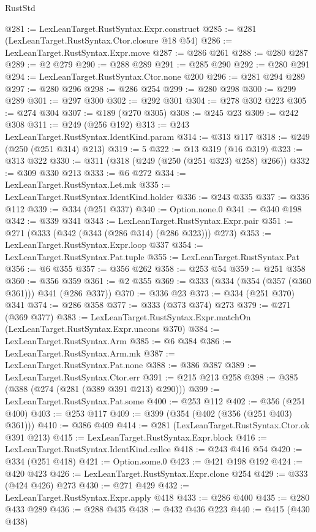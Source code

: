 \begin{lexlean}{RustStd}
\begin{coremodule}
@281 := LexLeanTarget.RustSyntax.Expr.construct
@285 := @281 (LexLeanTarget.RustSyntax.Ctor.closure @18 @54)
@286 := LexLeanTarget.RustSyntax.Expr.move
@287 := @286 @261
@288 := @280 @287
@289 := @2 @279
@290 := @288 @289
@291 := @285 @290
@292 := @280 @291
@294 := LexLeanTarget.RustSyntax.Ctor.none @200
@296 := @281 @294 @289
@297 := @280 @296
@298 := @286 @254
@299 := @280 @298
@300 := @299 @289
@301 := @297 @300
@302 := @292 @301
@304 := @278 @302 @223
@305 := @274 @304
@307 := @189 (@270 @305)
@308 := @245 @23
@309 := @242 @308
@311 := @249 (@256 @192)
@313 := @243 LexLeanTarget.RustSyntax.IdentKind.param
@314 := @313 @117
@318 := @249 (@250 (@251 @314) @213)
@319 := 5
@322 := @13 @319 (@16 @319)
@323 := @313 @322
@330 := @311 (@318 (@249 (@250 (@251 @323) @258) @266))
@332 := @309 @330 @213
@333 := @6 @272
@334 := LexLeanTarget.RustSyntax.Let.mk
@335 := LexLeanTarget.RustSyntax.IdentKind.holder
@336 := @243 @335
@337 := @336 @112
@339 := @334 (@251 @337)
@340 := Option.none.{0}
@341 := @340 @198
@342 := @339 @341
@343 := LexLeanTarget.RustSyntax.Expr.pair
@351 := @271 (@333 (@342 (@343 (@286 @314) (@286 @323))) @273)
@353 := LexLeanTarget.RustSyntax.Expr.loop @337
@354 := LexLeanTarget.RustSyntax.Pat.tuple
@355 := LexLeanTarget.RustSyntax.Pat
@356 := @6 @355
@357 := @356 @262
@358 := @253 @54
@359 := @251 @358
@360 := @356 @359
@361 := @2 @355
@369 := @333 (@334 (@354 (@357 (@360 @361))) @341 (@286 @337))
@370 := @336 @23
@373 := @334 (@251 @370) @341
@374 := @286 @358
@377 := @333 (@373 @374) @273
@379 := @271 (@369 @377)
@383 := LexLeanTarget.RustSyntax.Expr.matchOn (LexLeanTarget.RustSyntax.Expr.uncons @370)
@384 := LexLeanTarget.RustSyntax.Arm
@385 := @6 @384
@386 := LexLeanTarget.RustSyntax.Arm.mk
@387 := LexLeanTarget.RustSyntax.Pat.none
@388 := @386 @387
@389 := LexLeanTarget.RustSyntax.Ctor.err
@391 := @215 @213 @258
@398 := @385 (@388 (@274 (@281 (@389 @391 @213) @290)))
@399 := LexLeanTarget.RustSyntax.Pat.some
@400 := @253 @112
@402 := @356 (@251 @400)
@403 := @253 @117
@409 := @399 (@354 (@402 (@356 (@251 @403) @361)))
@410 := @386 @409
@414 := @281 (LexLeanTarget.RustSyntax.Ctor.ok @391 @213)
@415 := LexLeanTarget.RustSyntax.Expr.block
@416 := LexLeanTarget.RustSyntax.IdentKind.callee
@418 := @243 @416 @54
@420 := @334 (@251 @418)
@421 := Option.some.{0}
@423 := @421 @198 @192
@424 := @420 @423
@426 := LexLeanTarget.RustSyntax.Expr.clone @254
@429 := @333 (@424 @426) @273
@430 := @271 @429
@432 := LexLeanTarget.RustSyntax.Expr.apply @418
@433 := @286 @400
@435 := @280 @433 @289
@436 := @288 @435
@438 := @432 @436 @223
@440 := @415 (@430 @438)

\end{coremodule}
\end{lexlean}
